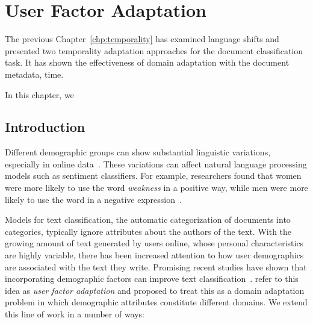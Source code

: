 \chapter{User Factor Adaptation}
\label{chp:user}

The previous Chapter~\ref{chp:temporality} has examined language shifts and presented two temporality adaptation approaches for the document classification task. 
It has shown the effectiveness of domain adaptation with the document metadata, time.

In this chapter, we 

\section{Introduction}
Different demographic groups can show substantial linguistic variations, especially in online data~\cite{goel2016social,johannsen2015cross}. 
These variations can affect natural language processing models such as sentiment classifiers.
For example, researchers found that women were more likely to use the word \textit{weakness} in a positive way, while men were more likely to use the word in a negative expression~\cite{volkova2013exploring}.

Models for text classification,
the automatic categorization of documents into categories, 
typically ignore attributes about the authors of the text.
With the growing amount of text generated by users online, whose personal characteristics are highly variable,
there has been increased attention to how user demographics are associated with the text they write.
Promising recent studies have shown that incorporating demographic factors can improve text classification~\cite{volkova2013exploring,hovy2015demographic,yang2017overcoming, li2018towards}. 
\cite{lynn2017human} refer to this idea as {\em user factor adaptation}
and proposed to treat this as a domain adaptation problem in which demographic attributes constitute different domains.
We extend this line of work in a number of ways:

